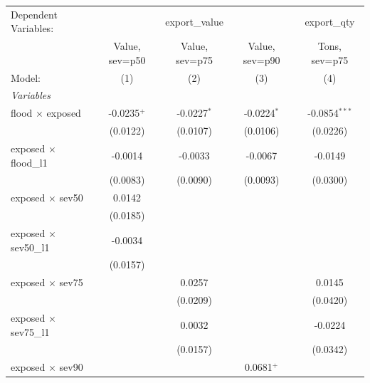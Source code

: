 
\begingroup
\centering
\begin{tabular}{lcccc}
   \tabularnewline \midrule \midrule
   Dependent Variables: & \multicolumn{3}{c}{export\_value} & export\_qty\\
                                & Value, sev=p50        & Value, sev=p75        & Value, sev=p90        & Tons, sev=p75 \\   
   Model:                       & (1)                   & (2)                   & (3)                   & (4)\\  
   \midrule
   \emph{Variables}\\
   flood $\times$ exposed       & -0.0235$^{+}$         & -0.0227$^{*}$         & -0.0224$^{*}$         & -0.0854$^{***}$\\   
                                & (0.0122)              & (0.0107)              & (0.0106)              & (0.0226)\\   
   exposed $\times$ flood\_l1   & -0.0014               & -0.0033               & -0.0067               & -0.0149\\   
                                & (0.0083)              & (0.0090)              & (0.0093)              & (0.0300)\\   
   exposed $\times$ sev50       & 0.0142                &                       &                       &   \\   
                                & (0.0185)              &                       &                       &   \\   
   exposed $\times$ sev50\_l1   & -0.0034               &                       &                       &   \\   
                                & (0.0157)              &                       &                       &   \\   
   exposed $\times$ sev75       &                       & 0.0257                &                       & 0.0145\\   
                                &                       & (0.0209)              &                       & (0.0420)\\   
   exposed $\times$ sev75\_l1   &                       & 0.0032                &                       & -0.0224\\   
                                &                       & (0.0157)              &                       & (0.0342)\\   
   exposed $\times$ sev90       &                       &                       & 0.0681$^{+}$          &   \\   

\end{tabular}
